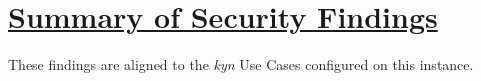 %
%
%

\chapter[Summary of Security Findings]{\underline{Summary of Security Findings}}
%
These findings are aligned to the \textit{kyn} Use Cases configured on this instance.\\


